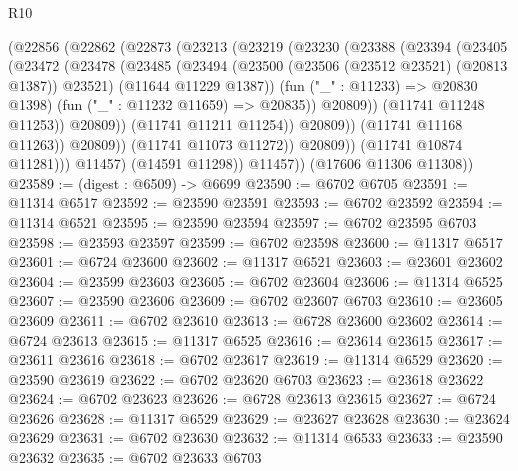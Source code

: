 \begin{lexlean}{R10}
\begin{coremodule}
                        (@22856
                          (@22862
                            (@22873
                              (@23213
                                (@23219
                                  (@23230
                                    (@23388
                                      (@23394
                                        (@23405
                                          (@23472
                                            (@23478
                                              (@23485
                                                (@23494
                                                  (@23500
                                                    (@23506 (@23512 @23521) (@20813 @1387))
                                                    @23521)
                                                  (@11644 @11229 @1387))
                                                (fun ("_" : @11233) => @20830 @1398)
                                                (fun ("_" : @11232 @11659) => @20835))
                                              @20809))
                                          (@11741 @11248 @11253))
                                        @20809))
                                    (@11741 @11211 @11254))
                                  @20809))
                              (@11741 @11168 @11263))
                            @20809))
                        (@11741 @11073 @11272))
                      @20809))
                  (@11741 @10874 @11281)))
              @11457)
            (@14591 @11298))
          @11457))
      (@17606 @11306 @11308))
@23589 := (digest : @6509) -> @6699
@23590 := @6702 @6705
@23591 := @11314 @6517
@23592 := @23590 @23591
@23593 := @6702 @23592
@23594 := @11314 @6521
@23595 := @23590 @23594
@23597 := @6702 @23595 @6703
@23598 := @23593 @23597
@23599 := @6702 @23598
@23600 := @11317 @6517
@23601 := @6724 @23600
@23602 := @11317 @6521
@23603 := @23601 @23602
@23604 := @23599 @23603
@23605 := @6702 @23604
@23606 := @11314 @6525
@23607 := @23590 @23606
@23609 := @6702 @23607 @6703
@23610 := @23605 @23609
@23611 := @6702 @23610
@23613 := @6728 @23600 @23602
@23614 := @6724 @23613
@23615 := @11317 @6525
@23616 := @23614 @23615
@23617 := @23611 @23616
@23618 := @6702 @23617
@23619 := @11314 @6529
@23620 := @23590 @23619
@23622 := @6702 @23620 @6703
@23623 := @23618 @23622
@23624 := @6702 @23623
@23626 := @6728 @23613 @23615
@23627 := @6724 @23626
@23628 := @11317 @6529
@23629 := @23627 @23628
@23630 := @23624 @23629
@23631 := @6702 @23630
@23632 := @11314 @6533
@23633 := @23590 @23632
@23635 := @6702 @23633 @6703

\end{coremodule}
\end{lexlean}
